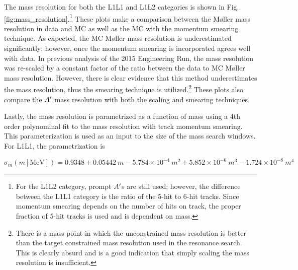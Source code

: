 The mass resolution for both the L1L1 and L1L2 categories is shown in Fig. \ref{fig:mass_resolution}.\footnote{For the L1L2 category, prompt $A^\prime$s are still used; however, the difference between the L1L1 category is the ratio of the 5-hit to 6-hit tracks. Since momentum smearing depends on the number of hits on track, the proper fraction of 5-hit tracks is used and is dependent on mass.} These plots make a comparison between the M\o ller mass resolution in data and MC as well as the MC with the momentum smearing technique. As expected, the MC M\o ller mass resolution is underestimated significantly; however, once the momentum smearing is incorporated agrees well with data. In previous analysis of the 2015 Engineering Run, the mass resolution was re-scaled by a constant factor of the ratio between the data to MC M\o ller mass resolution. However, there is clear evidence that this method underestimates the mass resolution, thus the smearing technique is utilized.\footnote{There is a mass point in which the unconstrained mass resolution is better than the target constrained mass resolution used in the resonance search. This is clearly absurd and is a good indication that simply scaling the mass resolution is insufficient.} These plots also compare the $A^\prime$ mass resolution with both the scaling and smearing techniques.


Lastly, the mass resolution is parametrized as a function of mass using a 4th order polynominal fit to the mass resolution with track momentum smearing. This parameterization is used as an input to the size of the mass search windows. For L1L1, the parametrization is

\begin{equation}
    \sigma_m(m\mathrm{[MeV]}) = 0.9348 + 0.05442 \ m -5.784\times 10^{-4} \ m^2 + 5.852\times 10^{-6} \ m^3 - 1.724\times 10^{-8} \ m^4
    \label{eq:mres_L1L1}
\end{equation}

